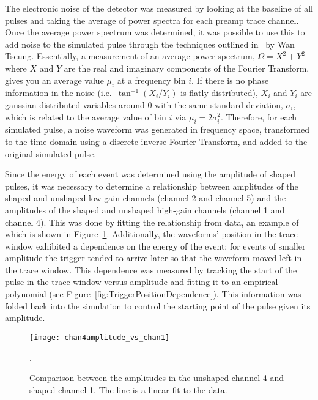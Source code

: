 	The electronic noise of the detector was measured by looking at the baseline of all pulses and taking the average of power spectra for each preamp trace channel.  Once the average power spectrum was determined, it was possible to use this to add noise to the simulated pulse through the techniques outlined in~\cite{WanThesis08} by Wan Tseung.  Essentially, a measurement of an average power spectrum, $\Omega = X^{2} + Y^{2}$ where $X$ and $Y$ are the real and imaginary components of the Fourier Transform, gives you an average value $\mu_{i}$ at a frequency bin $i$.  If there is no phase information in the noise (i.e.~$\tan^{-1} (X_{i}/Y_{i})$ is flatly distributed), $X_{i}$ and $Y_{i}$ are gaussian-distributed variables around 0 with the same standard deviation, $\sigma_{i}$, which is related to the average value of bin $i$ via  $\mu_{i} = 2 \sigma_{i}^{2}$.  Therefore, for each simulated pulse, a noise waveform was generated in frequency space, transformed to the time domain using a discrete inverse Fourier Transform, and added to the original simulated pulse.  
	
	Since the energy of each event was determined using the amplitude of shaped pulses, it was necessary to determine a relationship between amplitudes of the shaped and unshaped low-gain channels (channel 2 and channel 5) and the amplitudes of the shaped and unshaped high-gain channels (channel 1 and channel 4).  This was done by fitting the relationship from data, an example of which is shown in Figure~\ref{fig:Risetimechan2vschan4}.  Additionally, the waveforms' position in the trace window exhibited a dependence on the energy of the event: for events of smaller amplitude the trigger tended to arrive later so that the waveform moved left in the trace window.  This dependence was measured by tracking the start of the pulse in the trace window versus amplitude and fitting it to an empirical polynomial (see Figure~\ref{fig:TriggerPositionDependence}).  This information was folded back into the simulation to control the starting point of the pulse given its amplitude.
	
					\begin{figure}
						\centering
						\texttt{[image: chan4amplitude\_vs\_chan1]}
						\caption[Comparison between the amplitudes in the unshaped and shaped BeGe channels]
						{Comparison between the amplitudes in the unshaped channel 4 and shaped channel 1.  
						The line is a linear fit to the data.}
						\label{fig:Risetimechan2vschan4}.
					\end{figure}
					
